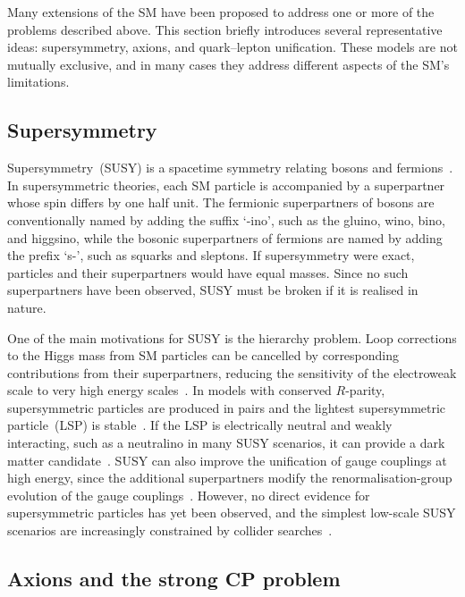 Many extensions of the SM have been proposed to address one or more of the problems described above. 
This section briefly introduces several representative ideas: supersymmetry, axions, and quark--lepton unification. 
These models are not mutually exclusive, and in many cases they address different aspects of the SM's limitations.

\subsection{Supersymmetry}
\label{subsec:susy}

Supersymmetry~(SUSY) is a spacetime symmetry relating bosons and fermions~\cite{WessZumino1974,MartinSUSYPrimer}.
In supersymmetric theories, each SM particle is accompanied by a superpartner whose spin differs by one half unit.
The fermionic superpartners of bosons are conventionally named by adding the suffix `-ino', such as the gluino, wino, bino, and higgsino, while the bosonic superpartners of fermions are named by adding the prefix `s-', such as squarks and sleptons.
If supersymmetry were exact, particles and their superpartners would have equal masses.
Since no such superpartners have been observed, SUSY must be broken if it is realised in nature.

One of the main motivations for SUSY is the hierarchy problem.
Loop corrections to the Higgs mass from SM particles can be cancelled by corresponding contributions from their superpartners, reducing the sensitivity of the electroweak scale to very high energy scales~\cite{DimopoulosGeorgi1981}.
In models with conserved $R$-parity, supersymmetric particles are produced in pairs and the lightest supersymmetric particle~(LSP) is stable~\cite{FarrarFayet1978}.
If the LSP is electrically neutral and weakly interacting, such as a neutralino in many SUSY scenarios, it can provide a dark matter candidate~\cite{Goldberg1983,EllisOliveSantosoSpanos1984}.
SUSY can also improve the unification of gauge couplings at high energy, since the additional superpartners modify the renormalisation-group evolution of the gauge couplings~\cite{DimopoulosRabyWilczek1981,Amaldi1991}.
However, no direct evidence for supersymmetric particles has yet been observed, and the simplest low-scale SUSY scenarios are increasingly constrained by collider searches~\cite{ATLAS2024SUSYSummary}.

\subsection{Axions and the strong CP problem}
\label{subsec:axion}

